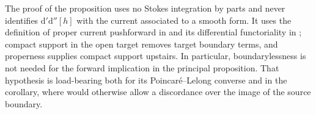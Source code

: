 \begin{remark}
\label{rem:p062-proper-full-rank-moment-boundary-audit}
The proof of the proposition uses no Stokes integration by parts and never
identifies $\mathrm d'\mathrm d''[h]$ with the current associated to a
smooth form.  It uses the definition of proper current pushforward in
\cite[\S7.1.11]{CLD25} and its differential functoriality in
\cite[\S7.7.8]{CLD25}; compact support in the open target removes target
boundary terms, and properness supplies compact support upstairs.  In
particular, boundarylessness is not needed for the forward implication in
the principal proposition.  That hypothesis is load-bearing both for its
Poincar\'e--Lelong converse and in the corollary,
where \cite[Theorem~6.6.8]{CLD25} would otherwise allow a discordance over
the image of the source boundary.
\end{remark}
